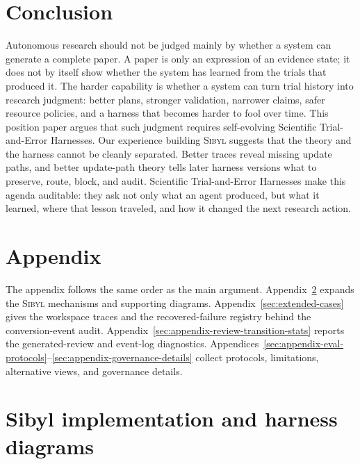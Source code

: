 \documentclass{article}
\newcommand{\sibyl}{\textsc{Sibyl}}
\begin{document}
\section{Conclusion}
Autonomous research should not be judged mainly by whether a system can generate a complete paper. A paper is only an expression of an evidence state; it does not by itself show whether the system has learned from the trials that produced it. The harder capability is whether a system can turn trial history into research judgment: better plans, stronger validation, narrower claims, safer resource policies, and a harness that becomes harder to fool over time.
This position paper argues that such judgment requires self-evolving Scientific Trial-and-Error Harnesses.
Our experience building \sibyl{} suggests that the theory and the harness cannot be cleanly separated. Better traces reveal missing update paths, and better update-path theory tells later harness versions what to preserve, route, block, and audit. Scientific Trial-and-Error Harnesses make this agenda auditable: they ask not only what an agent produced, but what it learned, where that lesson traveled, and how it changed the next research action.


\clearpage



\appendix
\clearpage

\section*{Appendix}

\noindent The appendix follows the same order as the main argument. Appendix~\ref{sec:appendix-implementation} expands the \sibyl{} mechanisms and supporting diagrams. Appendix~\ref{sec:extended-cases} gives the workspace traces and the recovered-failure registry behind the conversion-event audit. Appendix~\ref{sec:appendix-review-transition-stats} reports the generated-review and event-log diagnostics.  Appendices~\ref{sec:appendix-eval-protocols}--\ref{sec:appendix-governance-details} collect protocols, limitations, alternative views, and governance details.

\vspace{0.4em}

\section{Sibyl implementation and harness diagrams}
\label{sec:appendix-implementation}
\end{document}
